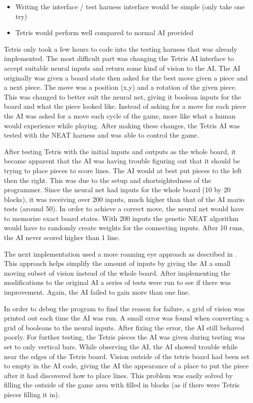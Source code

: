 \documentclass[12pt]{ucthesis} \newif\ifpdf \ifx\pdfoutput\undefined
\begin{document}
\begin{itemize}
\renewcommand{\labelitemi}{$\bullet$}
\item Writing the interface / test harness interface would be simple (only take one
try) 
\item Tetris would perform well compared to normal AI provided
\end{itemize}

Tetris only took a few hours to code into the testing harness that was already
implemented. The most difficult part was changing the Tetris AI interface to
accept suitable neural inputs and return some kind of vision to the AI. The AI
originally was given a board state then asked for the best move given a piece
and a next piece. The move was a position (x,y) and a rotation of the given
piece. This was changed to better suit the neural net, giving it boolean inputs
for the board and what the piece looked like. Instead of asking for a move for
each piece the AI was asked for a move each cycle of the game, more like what a
human would experience while playing. After making these changes, the Tetris AI
was tested with the NEAT harness and was able to control the game.

After testing Tetris with the initial inputs and outputs as the whole board, it
became apparent that the AI was having trouble figuring out that it should be
trying to place pieces to score lines. The AI would at best put pieces to the
left then the right. This was due to the setup and shortsightedness of the
programmer. Since the neural net had inputs for the whole board (10 by 20
blocks), it was receiving over 200 inputs, much higher than that of the AI mario
tests (around 50). In order to achieve a correct move, the neural net would have
to memorize exact board states. With 200 inputs the genetic NEAT algorithm would
have to randomly create weights for the connecting inputs. After 10 runs, the AI
never scored higher than 1 line.

The next implementation used a more roaming eye approach as described in
\cite{stanley:phd04}. This approach helps simplify the amount of inputs by
giving the AI a small moving subset of vision instead of the whole board. After
implementing the modifications to the original AI a series of tests were run to
see if there was improvement. Again, the AI failed to gain more than one line.

In order to debug the program to find the reason for failure, a
grid of vision was printed out each time the AI was run. A small error was found
when converting a grid of booleans to the neural inputs. After fixing the error,
the AI still behaved poorly. For further testing, the Tetris pieces the AI was given during testing
was set to only vertical bars. While observing the AI, the AI showed
trouble while near the edges of the Tetris board. Vision outside of the tetris
board had been set to empty in the AI code, giving the AI the appearance of a place to put the
piece after it had discovered how to place lines. This problem was easily solved
by filling the outside of the game area with filled in blocks (as if there were
Tetris pieces filling it in).
\end{document}
